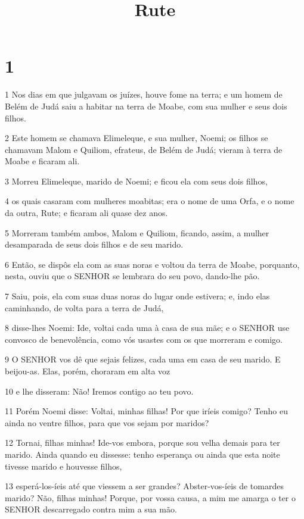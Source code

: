 

\title{Rute}


\chapter{1}

\par 1 Nos dias em que julgavam os juízes, houve fome na terra; e um homem de Belém de Judá saiu a habitar na terra de Moabe, com sua mulher e seus dois filhos.
\par 2 Este homem se chamava Elimeleque, e sua mulher, Noemi; os filhos se chamavam Malom e Quiliom, efrateus, de Belém de Judá; vieram à terra de Moabe e ficaram ali.
\par 3 Morreu Elimeleque, marido de Noemi; e ficou ela com seus dois filhos,
\par 4 os quais casaram com mulheres moabitas; era o nome de uma Orfa, e o nome da outra, Rute; e ficaram ali quase dez anos.
\par 5 Morreram também ambos, Malom e Quiliom, ficando, assim, a mulher desamparada de seus dois filhos e de seu marido.
\par 6 Então, se dispôs ela com as suas noras e voltou da terra de Moabe, porquanto, nesta, ouviu que o SENHOR se lembrara do seu povo, dando-lhe pão.
\par 7 Saiu, pois, ela com suas duas noras do lugar onde estivera; e, indo elas caminhando, de volta para a terra de Judá,
\par 8 disse-lhes Noemi: Ide, voltai cada uma à casa de sua mãe; e o SENHOR use convosco de benevolência, como vós usastes com os que morreram e comigo.
\par 9 O SENHOR vos dê que sejais felizes, cada uma em casa de seu marido. E beijou-as. Elas, porém, choraram em alta voz
\par 10 e lhe disseram: Não! Iremos contigo ao teu povo.
\par 11 Porém Noemi disse: Voltai, minhas filhas! Por que iríeis comigo? Tenho eu ainda no ventre filhos, para que vos sejam por maridos?
\par 12 Tornai, filhas minhas! Ide-vos embora, porque sou velha demais para ter marido. Ainda quando eu dissesse: tenho esperança ou ainda que esta noite tivesse marido e houvesse filhos,
\par 13 esperá-los-íeis até que viessem a ser grandes? Abster-vos-íeis de tomardes marido? Não, filhas minhas! Porque, por vossa causa, a mim me amarga o ter o SENHOR descarregado contra mim a sua mão.

